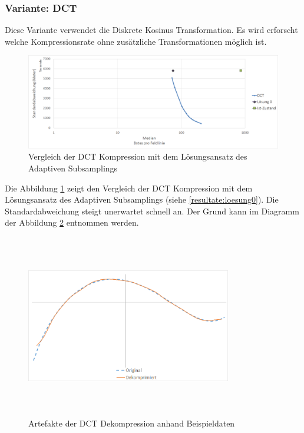 \subsubsection{Variante: DCT}\label{resultate:dct}
Diese Variante verwendet die Diskrete Kosinus Transformation. Es wird erforscht welche Kompressionsrate ohne zusätzliche Transformationen möglich ist.
\begin{figure}[!htbp]
	\center
	\includegraphics[width=1\textwidth,keepaspectratio]{./pictures/resultate/loesung1/loesung1-0/loesung1_0.png}
	\caption{Vergleich der DCT Kompression mit dem Lösungsansatz des Adaptiven Subsamplings}
	\label{resultate:loesung1:dct:resultate}
\end{figure}
Die Abbildung \ref{resultate:loesung1:dct:resultate} zeigt den Vergleich der DCT Kompression mit dem Lösungsansatz des Adaptiven Subsamplings (siehe \ref{resultate:loesung0}). Die Standardabweichung steigt unerwartet schnell an. Der Grund kann im Diagramm der Abbildung \ref{resultate:loesung1:dct:artefakte} entnommen werden. 
\begin{figure}[!htbp]
	\center
	\includegraphics[width=0.8\textwidth,height=8cm,keepaspectratio]{./pictures/resultate/loesung1/loesung1-0/loesung1_0_artefakte.png}
	\caption{Artefakte der DCT Dekompression anhand Beispieldaten}
	\label{resultate:loesung1:dct:artefakte}
\end{figure}
